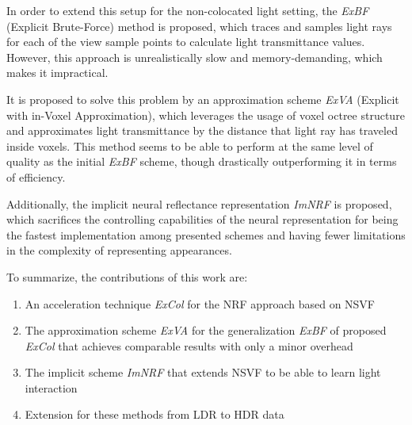 In order to extend this setup for the non-colocated light setting, the \textit{ExBF} (Explicit Brute-Force) method is proposed,
which traces and samples light rays for each of the view sample points to calculate light transmittance values.
However, this approach is unrealistically slow and memory-demanding,
which makes it impractical.

It is proposed to solve this problem by an approximation scheme \textit{ExVA} (Explicit with in-Voxel Approximation),
which leverages the usage of voxel octree structure
and approximates light transmittance by the distance that light ray has traveled inside voxels.
This method seems to be able to perform at the same level of quality as the initial \textit{ExBF} scheme,
though drastically outperforming it in terms of efficiency.

Additionally, the implicit neural reflectance representation \textit{ImNRF} is proposed,
which sacrifices the controlling capabilities of the neural representation
for being the fastest implementation among presented schemes
and having fewer limitations in the complexity of representing appearances.


To summarize, the contributions of this work are:
\begin{enumerate}
    \item An acceleration technique \textit{ExCol} for the NRF approach
    based on NSVF
    \item The approximation scheme \textit{ExVA}
    for the generalization \textit{ExBF} of proposed \textit{ExCol}
    that achieves comparable results with only a minor overhead
    \item The implicit scheme \textit{ImNRF} that extends NSVF to be able to learn light interaction
    \item Extension for these methods from LDR to HDR data
\end{enumerate}











